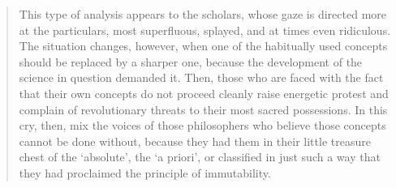\begin{quotation}
This type of analysis appears to the scholars, whose gaze is directed more at the particulars, most superfluous, splayed, and at times even ridiculous. The situation changes, however, when one of the habitually used concepts should be replaced by a sharper one, because the development of the science in question demanded it. Then, those who are faced with the fact that their own concepts do not proceed cleanly raise energetic protest and complain of revolutionary threats to their most sacred possessions. In this cry, then, mix the voices of those philosophers who believe those concepts cannot be done without, because they had them in their little treasure chest of the `absolute', the `a priori', or classified in just such a way that they had proclaimed the principle of immutability.
\end{quotation}

